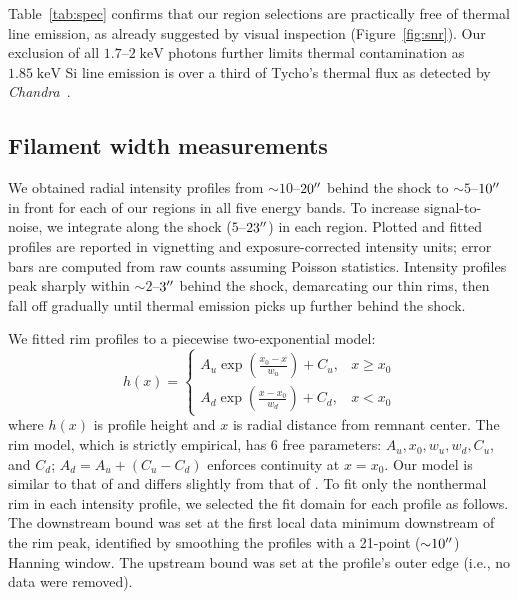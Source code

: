\documentclass[iop, apj, numberedappendix, twocolappendix]{emulateapj}
\newcommand*{\mt}{\mathrm}
\newcommand*{\unit}[1]{\;\mt{#1}}  %
\newcommand*{\abt}{\mathord{\sim}} %
\newcommand*{\Chandra}{\textit{Chandra}\ }
\begin{document}
Table~\ref{tab:spec} confirms that our region selections are practically free
of thermal line emission, as already suggested by visual inspection
(Figure~\ref{fig:snr}).  Our exclusion of all $1.7$--$2 \unit{keV}$ photons
further limits thermal contamination as $1.85 \unit{keV}$ Si line emission is
over a third of Tycho's thermal flux as detected by \Chandra \citep{hwang2002}.

\subsection{Filament width measurements}
\label{sec:fwhms}

We obtained radial intensity profiles from $\abt 10$--$20\mbox{$^{\prime\prime}$}$ behind the
shock to $\abt 5$--$10\mbox{$^{\prime\prime}$}$ in front for each of our regions in all five
energy bands.  To increase signal-to-noise, we integrate along the shock
($5$--$23\mbox{$^{\prime\prime}$}$) in each region.  Plotted and fitted profiles are reported in
vignetting and exposure-corrected intensity units; error bars are computed from
raw counts assuming Poisson statistics.  Intensity profiles peak sharply
within $\abt 2$--$3\mbox{$^{\prime\prime}$}$ behind the shock, demarcating our thin rims,
then fall off gradually until thermal emission picks up further behind the
shock.

We fitted rim profiles to a piecewise two-exponential model:
\begin{equation} \label{eq:prof}
    h(x) =
    \begin{cases}
        A_u \exp \left(\frac{x_0 - x}{w_u}\right) + C_u, &x \geq x_0 \\
        A_d \exp \left(\frac{x - x_0}{w_d}\right) + C_d, &x < x_0
    \end{cases}
\end{equation}
where $h(x)$ is profile height and $x$ is radial distance from remnant center.
The rim model, which is strictly empirical, has 6 free parameters:
$A_u, x_0, w_u, w_d, C_u$, and $C_d$; $A_d = A_u + (C_u - C_d)$ enforces
continuity at $x=x_0$. Our model is similar to that of \citet{bamba2003,
bamba2005-hist} and differs slightly from that of .
To fit only the nonthermal rim in each intensity profile, we selected the fit
domain for each profile as follows.  The downstream bound was set at the first
local data minimum downstream of the rim peak, identified by smoothing the
profiles with a 21-point ($\abt 10\arcsec$) Hanning window.  The upstream bound
was set at the profile's outer edge (i.e., no data were removed).
\end{document}
